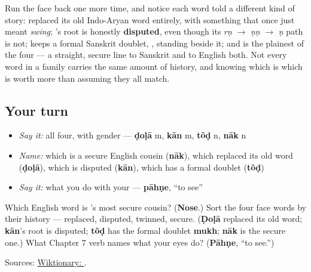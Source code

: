 \begin{culture}
Run the face back one more time, and notice each word told a different kind of story: \textbf{} replaced its old Indo-Aryan word entirely, with something that once just meant \emph{swing}; \textbf{}'s root is honestly \textbf{disputed}, even though its \emph{rṇ} $\to$ \emph{ṇṇ} $\to$ \emph{ṇ} path is not; \textbf{} keeps a formal Sanskrit doublet, \textbf{}, standing beside it; and \textbf{} is the plainest of the four — a straight, secure line to Sanskrit and to English both. Not every word in a family carries the same amount of history, and knowing which is which is worth more than assuming they all match.
\end{culture}

\subsection*{Your turn}
\begin{itemize}
\raggedright
  \item \emph{Say it:} all four, with gender — \textbf{ḍoḷā} m, \textbf{kān} m, \textbf{tõḍ} n, \textbf{nāk} n
  \item \emph{Name:} which is a secure English cousin (\textbf{nāk}), which replaced its old word (\textbf{ḍoḷā}), which is disputed (\textbf{kān}), which has a formal doublet (\textbf{tõḍ})
  \item \emph{Say it:} what you do with your \textbf{} — \textbf{pāhṇe}, \textquotedblleft{}to see\textquotedblright{}
\end{itemize}

\begin{tcolorbox}[breakable,colback=teal!4,colframe=teal!35!black,title={Before you move on}]
Which English word is \textbf{}'s most secure cousin? (\textbf{Nose}.) Sort the four face words by their history — replaced, disputed, twinned, secure. (\textbf{Ḍoḷā} replaced its old word; \textbf{kān}'s root is disputed; \textbf{tõḍ} has the formal doublet \textbf{mukh}; \textbf{nāk} is the secure one.) What Chapter 7 verb names what your eyes do? (\textbf{Pāhṇe}, \textquotedblleft{}to see.\textquotedblright{})

Sources: \href{https://en.wiktionary.org/wiki/\%E0\%A4\%A8\%E0\%A4\%BE\%E0\%A4\%95}{Wiktionary: }.
\end{tcolorbox}
